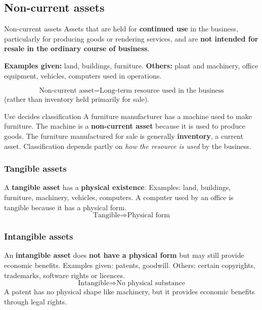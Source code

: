 \documentclass[11pt,a4paper]{article}
\begin{document}
\subsection{Non-current assets}

\begin{defbox}{Non-current assets}
Assets that are held for \textbf{continued use} in the business, particularly for producing goods or
rendering services, and are \textbf{not intended for resale in the ordinary course of business}.
\end{defbox}

\textbf{Examples given:} land, buildings, furniture. \textbf{Others:} plant and machinery, office equipment,
vehicles, computers used in operations.

\[
\boxed{\text{Non-current asset}=\text{Long-term resource used in the business}}
\]
(rather than inventory held primarily for sale).

\begin{exbox}{Use decides classification}
A furniture manufacturer has a machine used to make furniture. The machine is a \textbf{non-current asset}
because it is used to produce goods. The furniture manufactured for sale is generally \textbf{inventory}, a
current asset. Classification depends partly on \emph{how the resource is used} by the business.
\end{exbox}

\subsubsection{Tangible assets}

A \textbf{tangible asset} has a \textbf{physical existence}. Examples: land, buildings, furniture, machinery,
vehicles, computers. A computer used by an office is tangible because it has a physical form.
\[
\boxed{\text{Tangible}\Rightarrow\text{Physical form}}
\]

\subsubsection{Intangible assets}

An \textbf{intangible asset} does \textbf{not have a physical form} but may still provide economic benefits.
Examples given: patents, goodwill. Others: certain copyrights, trademarks, software rights or licences.
\[
\boxed{\text{Intangible}\Rightarrow\text{No physical substance}}
\]
A patent has no physical shape like machinery, but it provides economic benefits through legal rights.
\end{document}
